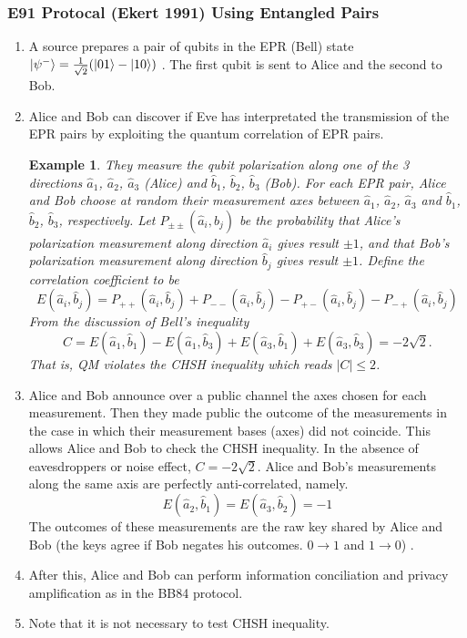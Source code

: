 \documentclass[]{book}
\newtheorem*{example}{Example}
\theoremstyle{nonumberplain}
\begin{document}
\subsubsection{E91 Protocal (Ekert 1991) Using Entangled Pairs}
\begin{enumerate}
    \item A source prepares a pair of qubits in the EPR (Bell) state $\ket{\psi^{-}}=\frac{1}{\sqrt{2}}(\ket{01}-\ket{10})$ . The first qubit is sent to Alice and the second to Bob. 
    \item Alice and Bob can discover if Eve has interpretated the transmission of the EPR pairs by exploiting the quantum correlation of EPR pairs.
\begin{example}
    They measure the qubit polarization along one of the 3 directions $\hat{a}_{1}$, $\hat{a}_{2}$, $\hat{a}_{3}$ (Alice) and $\hat{b}_{1}$, $\hat{b}_{2}$, $\hat{b}_{3}$ (Bob). For each EPR pair, Alice and Bob choose at random their measurement axes between $\hat{a}_{1}$, $\hat{a}_{2}$, $\hat{a}_{3}$ and $\hat{b}_{1}$, $\hat{b}_{2}$, $\hat{b}_{3}$, respectively. Let $P_{\pm \pm}(\hat{a}_{i}, \hat{b}_{j})$ be the probability that Alice's polarization measurement along direction $\hat{a}_{i}$ gives result $\pm 1$, and that Bob's polarization measurement along direction $\hat{b}_{j}$ gives result $\pm 1$. Define the correlation coefficient to be
    $$E(\hat{a}_{i}, \hat{b}_{j}) = P_{++}(\hat{a}_{i}, \hat{b}_{j}) + P_{--}(\hat{a}_{i}, \hat{b}_{j}) - P_{+-}(\hat{a}_{i}, \hat{b}_{j}) - P_{-+}(\hat{a}_{i}, \hat{b}_{j})$$
    From the discussion of Bell's inequality
    $$C=E(\hat{a}_{1},\hat{b}_{1})-E(\hat{a}_{1},\hat{b}_{3})+E(\hat{a}_{3},\hat{b}_{1})+E(\hat{a}_{3},\hat{b}_{3}) = -2 \sqrt{2}.$$
    That is, QM violates the CHSH inequality which reads $|C| \leq 2$.
\end{example}
    \item Alice and Bob announce over a public channel the axes chosen for each measurement. Then they made public the outcome of the measurements in the case in which their measurement bases (axes) did not coincide. This allows Alice and Bob to check the CHSH inequality. In the absence of eavesdroppers or noise effect, $C = -2 \sqrt{2}$. Alice and Bob's measurements along the same axis are perfectly anti-correlated, namely.
    $$E(\hat{a}_{2},\hat{b}_{1}) = E(\hat{a}_{3},\hat{b}_{2}) = -1$$
    The outcomes of these measurements are the raw key shared by Alice and Bob (the keys agree if Bob negates his outcomes. $0 \rightarrow 1$ and $1 \rightarrow 0$) .
    \item After this, Alice and Bob can perform information conciliation and privacy amplification as in the BB84 protocol.
    \item Note that it is not necessary to test CHSH inequality.

\end{enumerate}
\end{document}
